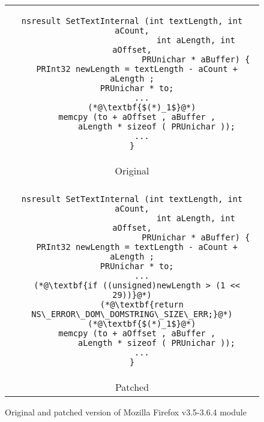 \begin{figure}
\centering
\begin{tabular}{c}
\begin{lstlisting}
nsresult SetTextInternal (int textLength, int aCount,
                          int aLength, int aOffset,
                          PRUnichar * aBuffer) {
  PRInt32 newLength = textLength - aCount + aLength ;
  PRUnichar * to;
    ...
    (*@\textbf{$(*)_1$}@*)
  memcpy (to + aOffset , aBuffer ,
          aLength * sizeof ( PRUnichar ));
    ...
}
\end{lstlisting}
\\
Original
\\
\hline
\\
\begin{lstlisting}
nsresult SetTextInternal (int textLength, int aCount,
                          int aLength, int aOffset,
                          PRUnichar * aBuffer) {
  PRInt32 newLength = textLength - aCount + aLength ;
  PRUnichar * to;
    ...
  (*@\textbf{if ((unsigned)newLength > (1 << 29))}@*)
    (*@\textbf{return NS\_ERROR\_DOM\_DOMSTRING\_SIZE\_ERR;}@*)
    (*@\textbf{$(*)_1$}@*)
  memcpy (to + aOffset , aBuffer ,
          aLength * sizeof ( PRUnichar ));
    ...
}
\end{lstlisting}
\\
Patched
\end{tabular}
\caption{Original and patched version of Mozilla Firefox  v3.5-3.6.4 module}
\end{figure}